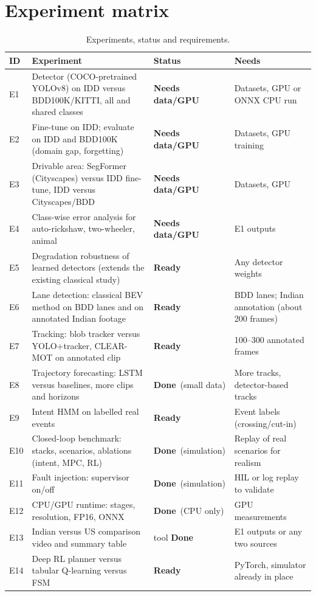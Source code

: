 \documentclass[11pt,a4paper]{article}
\newcommand{\done}{\textcolor{green!45!black}{\textbf{Done}}}
\newcommand{\ready}{\textcolor{orange!80!black}{\textbf{Ready}}}
\newcommand{\need}{\textcolor{red!70!black}{\textbf{Needs data/GPU}}}
\begin{document}
\section{Experiment matrix}
\begin{table}[h]
\centering\small
\caption{Experiments, status and requirements.}
\begin{tabular}{@{}l p{6.4cm} p{2.0cm} p{4.1cm}@{}}
\toprule
ID & Experiment & Status & Needs \\
\midrule
E1 & Detector (COCO-pretrained YOLOv8) on IDD versus BDD100K/KITTI, all and shared classes & \need & Datasets, GPU or ONNX CPU run \\
E2 & Fine-tune on IDD; evaluate on IDD and BDD100K (domain gap, forgetting) & \need & Datasets, GPU training \\
E3 & Drivable area: SegFormer (Cityscapes) versus IDD fine-tune, IDD versus Cityscapes/BDD & \need & Datasets, GPU \\
E4 & Class-wise error analysis for auto-rickshaw, two-wheeler, animal & \need & E1 outputs \\
E5 & Degradation robustness of learned detectors (extends the existing classical study) & \ready & Any detector weights \\
E6 & Lane detection: classical BEV method on BDD lanes and on annotated Indian footage & \ready & BDD lanes; Indian annotation (about 200 frames) \\
E7 & Tracking: blob tracker versus YOLO+tracker, CLEAR-MOT on annotated clip & \ready & 100--300 annotated frames \\
E8 & Trajectory forecasting: LSTM versus baselines, more clips and horizons & \done\ (small data) & More tracks, detector-based tracks \\
E9 & Intent HMM on labelled real events & \ready & Event labels (crossing/cut-in) \\
E10 & Closed-loop benchmark: stacks, scenarios, ablations (intent, MPC, RL) & \done\ (simulation) & Replay of real scenarios for realism \\
E11 & Fault injection: supervisor on/off & \done\ (simulation) & HIL or log replay to validate \\
E12 & CPU/GPU runtime: stages, resolution, FP16, ONNX & \done\ (CPU only) & GPU measurements \\
E13 & Indian versus US comparison video and summary table & tool \done & E1 outputs or any two sources \\
E14 & Deep RL planner versus tabular Q-learning versus FSM & \ready & PyTorch, simulator already in place \\
\bottomrule
\end{tabular}
\end{table}
\end{document}
